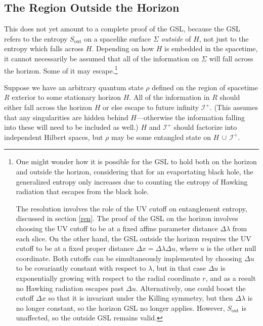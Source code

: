 \documentclass[12pt]{article}
\begin{document}
\subsection{The Region Outside the Horizon}\label{outside}

This does not yet amount to a complete proof of the GSL, because the GSL refers to the entropy $S_\mathrm{out}$ on a spacelike surface $\Sigma$ \emph{outside} of $H$, not just to the entropy which falls across $H$.  Depending on how $H$ is embedded in the spacetime, it cannot necessarily be assumed that all of the information on $\Sigma$ will fall across the horizon.  Some of it may escape.\footnote{One might wonder how it is possible for the GSL to hold both on the horizon and outside the horizon, considering that for an evaportating black hole, the generalized entropy only increases due to counting the entropy of Hawking radiation that escapes from the black hole.

The resolution involves the role of the UV cutoff on entanglement entropy, discussed in section \ref{ren}.  The proof of the GSL on the horizon involves choosing the UV cutoff to be at a fixed affine parameter distance $\Delta \lambda$ from each slice.  On the other hand, the GSL outside the horizon requires the UV cutoff to be at a fixed proper distance $\Delta x = \Delta \lambda \Delta u$, where $u$ is the other null coordinate.  Both cutoffs can be simultaneously implemented by choosing $\Delta u$ to be covariantly constant with respect to $\lambda$, but in that case $\Delta u$ is exponentially growing with respect to the radial coordinate $r$, and as a result no Hawking radiation escapes past $\Delta u$.  Alternatively, one could boost the cutoff $\Delta x$ so that it is invariant under the Killing symmetry, but then $\Delta \lambda$ is no longer constant, so the horizon GSL no longer applies.  However, $S_\mathrm{out}$ is unaffected, so the outside GSL remains valid.}

Suppose we have an arbitrary quantum state $\rho$ defined on the region of spacetime $R$ exterior to some stationary horizon $H$.  All of the information in $R$ should either fall across the horizon $H$ or else escape to future infinity $\mathcal{I}^+$.  (This assumes that any singularities are hidden behind $H$---otherwise the information falling into these will need to be included as well.)  $H$ and $\mathcal{I}^+$ should factorize into independent Hilbert spaces, but $\rho$ may be some entangled state on $H\,\cup\,\mathcal{I}^+$.
\end{document}
